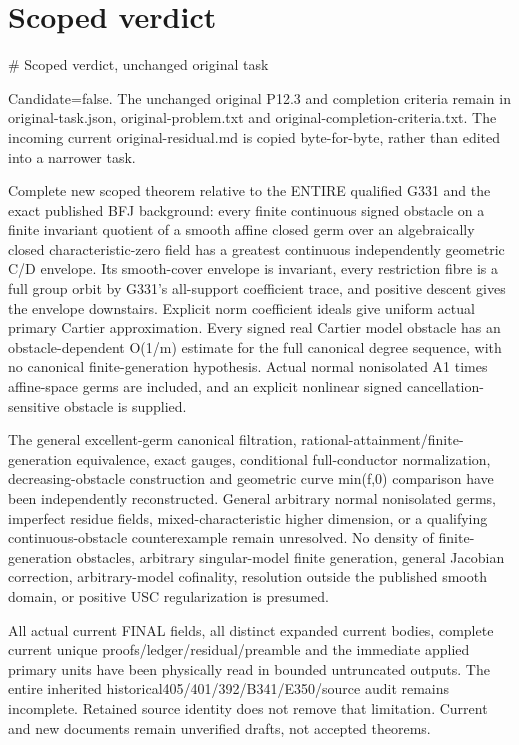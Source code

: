 \documentclass[11pt]{article}
\begin{document}
\section*{Scoped verdict}
\begin{RetainedDATA}
# Scoped verdict, unchanged original task

Candidate=false. The unchanged original P12.3 and completion criteria remain in original-task.json, original-problem.txt and original-completion-criteria.txt. The incoming current original-residual.md is copied byte-for-byte, rather than edited into a narrower task.

Complete new scoped theorem relative to the ENTIRE qualified G331 and the exact published BFJ background: every finite continuous signed obstacle on a finite invariant quotient of a smooth affine closed germ over an algebraically closed characteristic-zero field has a greatest continuous independently geometric C/D envelope. Its smooth-cover envelope is invariant, every restriction fibre is a full group orbit by G331's all-support coefficient trace, and positive descent gives the envelope downstairs. Explicit norm coefficient ideals give uniform actual primary Cartier approximation. Every signed real Cartier model obstacle has an obstacle-dependent O(1/m) estimate for the full canonical degree sequence, with no canonical finite-generation hypothesis. Actual normal nonisolated A1 times affine-space germs are included, and an explicit nonlinear signed cancellation-sensitive obstacle is supplied.

The general excellent-germ canonical filtration, rational-attainment/finite-generation equivalence, exact gauges, conditional full-conductor normalization, decreasing-obstacle construction and geometric curve min(f,0) comparison have been independently reconstructed. General arbitrary normal nonisolated germs, imperfect residue fields, mixed-characteristic higher dimension, or a qualifying continuous-obstacle counterexample remain unresolved. No density of finite-generation obstacles, arbitrary singular-model finite generation, general Jacobian correction, arbitrary-model cofinality, resolution outside the published smooth domain, or positive USC regularization is presumed.

All actual current FINAL fields, all distinct expanded current bodies, complete current unique proofs/ledger/residual/preamble and the immediate applied primary units have been physically read in bounded untruncated outputs. The entire inherited historical405/401/392/B341/E350/source audit remains incomplete. Retained source identity does not remove that limitation. Current and new documents remain unverified drafts, not accepted theorems.


\end{RetainedDATA}
\end{document}
